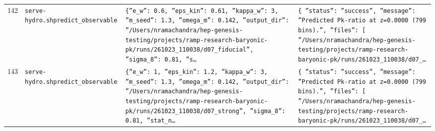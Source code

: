 \documentclass[11pt,a4paper]{article}
\begin{document}
\begin{longtable}{@{}p{}p{}p{}p{}@{}}
142 & \texttt{serve-hydro.sh}\newline\texttt{predict\_\allowbreak{}observable} & \texttt{\{''e\_\allowbreak{}w'':\allowbreak{} 0.6,\allowbreak{} ''eps\_\allowbreak{}kin'':\allowbreak{} 0.61,\allowbreak{} ''kappa\_\allowbreak{}w'':\allowbreak{} 3,\allowbreak{} ''m\_\allowbreak{}seed'':\allowbreak{} 1.3,\allowbreak{} ''omega\_\allowbreak{}m'':\allowbreak{} 0.142,\allowbreak{} ''output\_\allowbreak{}dir'':\allowbreak{} ''/\allowbreak{}Users/\allowbreak{}nramachandra/\allowbreak{}hep-genesis-testing/\allowbreak{}projects/\allowbreak{}ramp-research-baryonic-pk/\allowbreak{}runs/\allowbreak{}261023\_\allowbreak{}110038/\allowbreak{}d07\_\allowbreak{}fiducial'',\allowbreak{} ''sigma\_\allowbreak{}8'':\allowbreak{} 0.81,\allowbreak{} ''s\ldots{}\allowbreak{}} & \texttt{\{   ''status'':\allowbreak{} ''success'',\allowbreak{}   ''message'':\allowbreak{} ''Predicted Pk-ratio at z=\allowbreak{}0.0000 (799 bins)\allowbreak{}.'',\allowbreak{}   ''files'':\allowbreak{} [     ''/\allowbreak{}Users/\allowbreak{}nramachandra/\allowbreak{}hep-genesis-testing/\allowbreak{}projects/\allowbreak{}ramp-research-baryonic-pk/\allowbreak{}runs/\allowbreak{}261023\_\allowbreak{}110038/\allowbreak{}d07\_\allowbreak{}\ldots{}\allowbreak{}} \\
143 & \texttt{serve-hydro.sh}\newline\texttt{predict\_\allowbreak{}observable} & \texttt{\{''e\_\allowbreak{}w'':\allowbreak{} 1,\allowbreak{} ''eps\_\allowbreak{}kin'':\allowbreak{} 1.2,\allowbreak{} ''kappa\_\allowbreak{}w'':\allowbreak{} 3,\allowbreak{} ''m\_\allowbreak{}seed'':\allowbreak{} 1.3,\allowbreak{} ''omega\_\allowbreak{}m'':\allowbreak{} 0.142,\allowbreak{} ''output\_\allowbreak{}dir'':\allowbreak{} ''/\allowbreak{}Users/\allowbreak{}nramachandra/\allowbreak{}hep-genesis-testing/\allowbreak{}projects/\allowbreak{}ramp-research-baryonic-pk/\allowbreak{}runs/\allowbreak{}261023\_\allowbreak{}110038/\allowbreak{}d07\_\allowbreak{}strong'',\allowbreak{} ''sigma\_\allowbreak{}8'':\allowbreak{} 0.81,\allowbreak{} ''stat\_\allowbreak{}n\ldots{}\allowbreak{}} & \texttt{\{   ''status'':\allowbreak{} ''success'',\allowbreak{}   ''message'':\allowbreak{} ''Predicted Pk-ratio at z=\allowbreak{}0.0000 (799 bins)\allowbreak{}.'',\allowbreak{}   ''files'':\allowbreak{} [     ''/\allowbreak{}Users/\allowbreak{}nramachandra/\allowbreak{}hep-genesis-testing/\allowbreak{}projects/\allowbreak{}ramp-research-baryonic-pk/\allowbreak{}runs/\allowbreak{}261023\_\allowbreak{}110038/\allowbreak{}d07\_\allowbreak{}\ldots{}\allowbreak{}} \\

\end{longtable}
\end{document}
